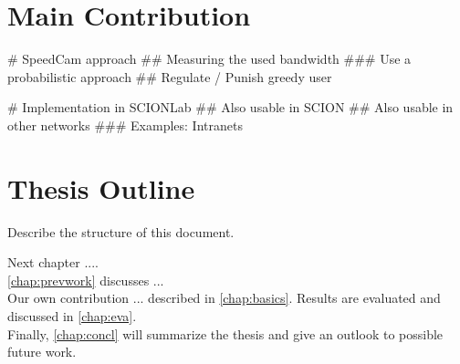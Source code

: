 \documentclass[thesis.tex]{subfiles}
\begin{document}
\section{Main Contribution}
    \begin{easylist}
        \MyListProperties
        # SpeedCam approach
        ## Measuring the used bandwidth
        ### Use a probabilistic approach 
        ## Regulate  / Punish greedy user
        
        # Implementation in SCIONLab
        ## Also usable in SCION
        ## Also usable in other networks
        ### Examples: Intranets 
    \end{easylist}
\section{Thesis Outline}
Describe the structure of this document.

Next chapter ....
\\
\autoref{chap:prevwork} discusses ...
\\
Our own contribution ... described in \autoref{chap:basics}.
Results are evaluated and discussed in \autoref{chap:eva}.
\\
Finally, \autoref{chap:concl} will summarize the thesis and give an outlook to possible future work.

\subfilebib %
\end{document}
